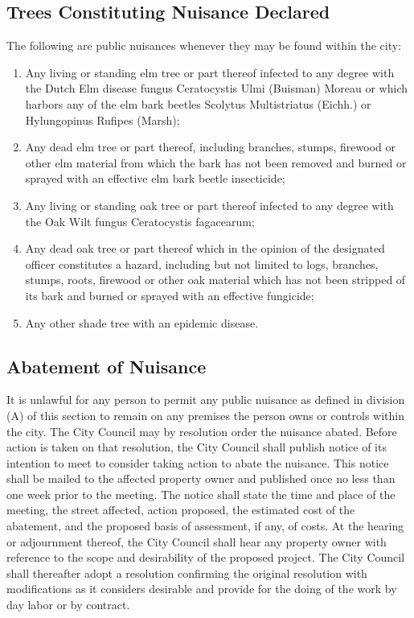 \documentclass[code.tex]{subfiles}
\begin{document}
\subsection{Trees Constituting Nuisance Declared}
The following are public nuisances whenever they may be found within the city:
\begin{enumerate}[{\indent}1)]
    \item Any living or standing elm tree or part thereof infected to any degree with the Dutch Elm disease fungus Ceratocystis Ulmi (Buisman) Moreau or which harbors any of the elm bark beetles Scolytus Multistriatus (Eichh.) or Hylungopinus Rufipes (Marsh);
    \item Any dead elm tree or part thereof, including branches, stumps, firewood or other elm material from which the bark has not been removed and burned or sprayed with an effective elm bark beetle insecticide;
    \item Any living or standing oak tree or part thereof infected to any degree with the Oak Wilt fungus Ceratocystis fagacearum;
    \item Any dead oak tree or part thereof which in the opinion of the designated officer constitutes a hazard, including but not limited to logs, branches, stumps, roots, firewood or other oak material which has not been stripped of its bark and burned or sprayed with an effective fungicide;
    \item Any other shade tree with an epidemic disease.
\end{enumerate}
\subsection{Abatement of Nuisance}
It is unlawful for any person to permit any public nuisance as defined in division (A) of this section to remain on any premises the person owns or controls within the city. The City Council may by resolution order the nuisance abated. Before action is taken on that resolution, the City Council shall publish notice of its intention to meet to consider taking action to abate the nuisance. This notice shall be mailed to the affected property owner and published once no less than one week prior to the meeting. The notice shall state the time and place of the meeting, the street affected, action proposed, the estimated cost of the abatement, and the proposed basis of assessment, if any, of costs. At the hearing or adjournment thereof, the City Council shall hear any property owner with reference to the scope and desirability of the proposed project. The City Council shall thereafter adopt a resolution confirming the original resolution with modifications as it considers desirable and provide for the doing of the work by day labor or by contract.
\end{document}
